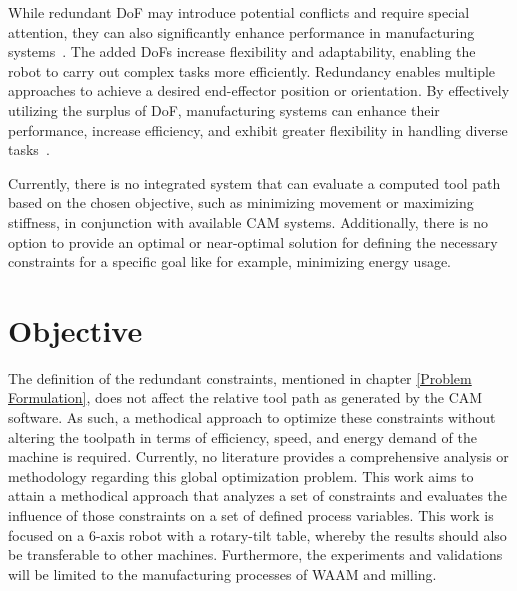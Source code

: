 
While redundant DoF may introduce potential conflicts and require special attention, they can also significantly enhance performance in manufacturing systems~\cite{Ayten.2016}. The added DoFs increase flexibility and adaptability, enabling the robot to carry out complex tasks more efficiently. Redundancy enables multiple approaches to achieve a desired end-effector position or orientation. By effectively utilizing the surplus of DoF, manufacturing systems can enhance their performance, increase efficiency, and exhibit greater flexibility in handling diverse tasks~\cite{Boscariol.2020}. 

Currently, there is no integrated system that can evaluate a computed tool path based on the chosen objective, such as minimizing movement or maximizing stiffness, in conjunction with available CAM systems. Additionally, there is no option to provide an optimal or near-optimal solution for defining the necessary constraints for a specific goal like for example, minimizing energy usage.


\section{Objective}\label{OBJECTIVE}
The definition of the redundant constraints, mentioned in chapter \ref{Problem Formulation}, does not affect the relative tool path as generated by the CAM software. As such, a methodical approach to optimize these constraints without altering the toolpath in terms of efficiency, speed, and energy demand of the machine is required. Currently, no literature provides a comprehensive analysis or methodology regarding this global optimization problem.
This work aims to attain a methodical approach that analyzes a set of constraints and evaluates the influence of those constraints on a set of defined process variables. This work is focused on a 6-axis robot with a rotary-tilt table, whereby the results should also be transferable to other machines. Furthermore, the experiments and validations will be limited to the manufacturing processes of WAAM and milling. 



